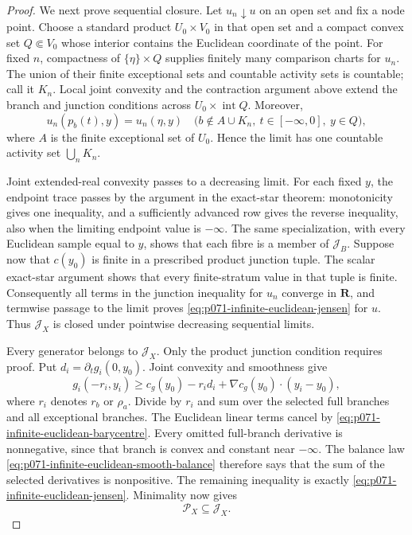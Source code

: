 \begin{proof}
We next prove sequential closure.  Let $u_n\downarrow u$ on an open set
and fix a node point.  Choose a standard product
$U_0\times V_0$ in that open set and a compact convex set
$Q\Subset V_0$ whose interior contains the Euclidean coordinate of the
point.  For fixed $n$, compactness of $\{\eta\}\times Q$ supplies
finitely many comparison charts for $u_n$.  The union of their finite
exceptional sets and countable activity sets is countable; call it
$K_n$.  Local joint convexity and the contraction argument above extend
the branch and junction conditions across $U_0\times\operatorname{int}Q$.
Moreover,
\begin{equation}
 u_n(p_b(t),y)=u_n(\eta,y)
 \quad
 \bigl(b\notin A\cup K_n,\ t\in[-\infty,0],\ y\in Q\bigr),
 \label{eq:p071-infinite-euclidean-limit-inactive}
\end{equation}
where $A$ is the finite exceptional set of $U_0$.  Hence the limit has
one countable activity set $\bigcup_nK_n$.

Joint extended-real convexity passes to a decreasing limit.  For each fixed
$y$, the endpoint trace passes by the argument in the exact-star theorem:
monotonicity gives one inequality, and a sufficiently advanced row gives
the reverse inequality, also when the limiting endpoint value is
$-\infty$.  The same specialization, with every Euclidean sample equal
to $y$, shows that each fibre is a member of $\mathscr J_B$.
Suppose now that $c(y_0)$ is finite in a prescribed product junction
tuple.  The scalar exact-star argument shows that every finite-stratum
value in that tuple is finite.  Consequently all terms in the junction
inequality for $u_n$ converge in $\mathbf R$, and termwise passage to
the limit proves \eqref{eq:p071-infinite-euclidean-jensen} for $u$.
Thus $\mathcal J_X$ is closed under pointwise decreasing sequential
limits.

Every generator belongs to $\mathcal J_X$.  Only the product junction
condition requires proof.  Put
$d_i=\partial_tg_i(0,y_0)$.  Joint convexity and smoothness give
\[
 g_i(-r_i,y_i)\geq
 c_g(y_0)-r_id_i+
 \nabla c_g(y_0)\mathbin\cdot(y_i-y_0),
\]
where $r_i$ denotes $r_b$ or $\rho_a$.  Divide by $r_i$ and sum
over the selected full branches and all exceptional branches.  The
Euclidean linear terms cancel by
\eqref{eq:p071-infinite-euclidean-barycentre}.  Every omitted full-branch
derivative is nonnegative, since that branch is convex and constant near
$-\infty$.  The balance law
\eqref{eq:p071-infinite-euclidean-smooth-balance} therefore says that the
sum of the selected derivatives is nonpositive.  The remaining inequality
is exactly \eqref{eq:p071-infinite-euclidean-jensen}.  Minimality now gives
\begin{equation}
                         \mathcal P_X\subseteq\mathcal J_X.
 \label{eq:p071-infinite-euclidean-minimality}
\end{equation}


\end{proof}
